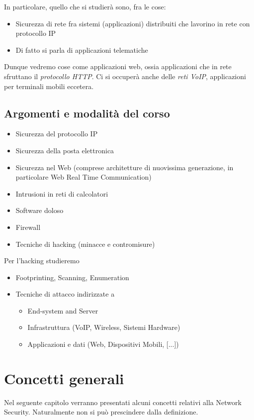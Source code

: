 \documentclass[14pt]{extreport}
\begin{document}
In particolare, quello che si studierà sono, fra le cose:
\begin{itemize}
    \item Sicurezza di rete fra sistemi (applicazioni) distribuiti che lavorino in rete con protocollo IP
    \item Di fatto si parla di applicazioni telematiche
\end{itemize}

Dunque vedremo cose come applicazioni web, ossia applicazioni che in rete sfruttano il \textit{protocollo HTTP}. Ci si occuperà anche delle \textit{reti VoIP}, applicazioni per terminali mobili eccetera.\newline

\section{Argomenti e modalità del corso}
\begin{itemize}
    \item Sicurezza del protocollo IP
    \item Sicurezza della posta elettronica
    \item Sicurezza nel Web (comprese architetture di nuovissima generazione, in particolare Web Real Time Communication)
    \item Intrusioni in reti di calcolatori
    \item Software doloso
    \item Firewall
    \item Tecniche di hacking (minacce e contromisure)
\end{itemize}

Per l'hacking studieremo

\begin{itemize}
    \item Footprinting, Scanning, Enumeration
    \item Tecniche di attacco indirizzate a
    \begin{itemize}
        \item End-system and Server
        \item Infrastruttura (VoIP, Wireless, Sistemi Hardware)
        \item Applicazioni e dati (Web, Dispositivi Mobili, [...])
    \end{itemize}
\end{itemize}

\chapter{Concetti generali}
Nel seguente capitolo verranno presentati alcuni concetti relativi alla Network Security. Naturalmente non si può prescindere dalla definizione.
\end{document}
